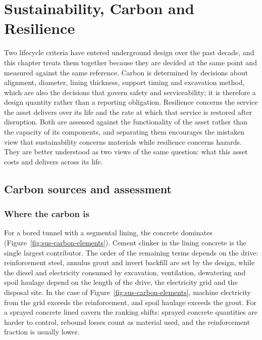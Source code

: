 %
\chapter{Sustainability, Carbon and Resilience}
\label{ch:sustainability}

Two lifecycle criteria have entered underground design over the past decade,
and this chapter treats them together because they are decided at the same
point and measured against the same reference. Carbon is determined by
decisions about alignment, diameter, lining thickness, support timing and
excavation method, which are also the decisions that govern safety and
serviceability; it is therefore a design quantity rather than a reporting
obligation. Resilience concerns the service the asset delivers over its life
and the rate at which that service is restored after disruption. Both are
assessed against the functionality of the asset rather than the capacity of
its components, and separating them encourages the mistaken view that
sustainability concerns materials while resilience concerns hazards. They are
better understood as two views of the same question: what this asset costs
and delivers across its life.

\section{Carbon sources and assessment}
\label{sec:carbon-sources}

\subsection{Where the carbon is}
\label{sec:embodied-carbon}

For a bored tunnel with a segmental lining, the concrete dominates
(Figure~\ref{fig:sus-carbon-elements}). Cement
clinker in the lining concrete is the single largest contributor. The order
of the remaining terms depends on the drive: reinforcement steel, annulus
grout and invert backfill are set by the design, while the diesel and
electricity consumed by excavation, ventilation, dewatering and spoil haulage
depend on the length of the drive, the electricity grid and the disposal
site. In the case of Figure~\ref{fig:sus-carbon-elements}, machine
electricity from the grid exceeds the reinforcement, and spoil
haulage exceeds the grout. For a
sprayed concrete lined cavern the ranking shifts: sprayed concrete quantities are
harder to control, rebound losses count as material used, and the reinforcement
fraction is usually lower.

